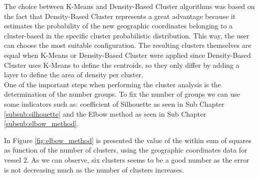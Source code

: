 The choice between K-Means and Density-Based Cluster algorithms was based on the fact that Density-Based Cluster represents a great advantage because it estimates the probability of the new geographic coordinates belonging to a cluster-based in the specific cluster probabilistic distribution. This way, the user can choose the most suitable configuration. The resulting clusters themselves are equal when K-Means or Density-Based Cluster were applied since Density-Based Cluster uses K-Means to define the centroids, so they only differ by adding a layer to define the area of density per cluster.
\\


%
%		    	     
%
%
%


One of the important steps when performing the cluster analysis is the determination of the number groups. To fix the number of groups we can use some indicators such as: coefficient of Silhouette as seen in Sub Chapter \ref{subsub:silhouette} and the Elbow method as seen in Sub Chapter \ref{subsub:elbow_method}. 


In Figure \ref{fig:elbow_method} is presented the value of the within sum of squares as function of the number of clusters, using the geographic coordinates data for vessel 2. As we can observe, six clusters seems to be a good number as the error is not decreasing much as the number of clusters increases. 


